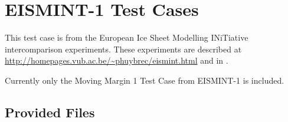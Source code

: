 \FloatBarrier


\section{EISMINT-1 Test Cases}
\label{sec:eismint_description}
This test case is from the European Ice Sheet Modelling INiTiative intercomparison experiments.  These experiments are described at \url{http://homepages.vub.ac.be/~phuybrec/eismint.html} and in \citet{huybrechts1996}.

Currently only the Moving Margin 1 Test Case from EISMINT-1 is included.


\subsection{Provided Files}
\label{subsec:eismint_files}


